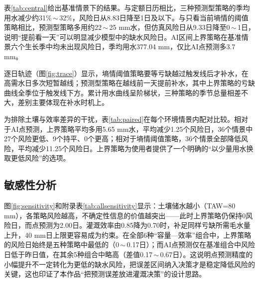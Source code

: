 表\ref{tab:central}给出基准情景下的结果。与定额日历相比，三种预测型策略的季均用水减少约31\%\,$\sim$\,32\%，风险日从8.83日降至1日及以下。与只看当前墒情的阈值策略相比，预测型策略多用约22\,$\sim$\,25 mm水，但仿真风险日从9.33日降至0\,$\sim$\,1日，说明“提前看一天”可以明显减少模型中的缺水风险日。AI区间上界策略在基准情景六个生长季中均未出现风险日，季均用水377.04 mm，仅比AI点预测多3.7 mm。


逐日轨迹（图\ref{fig:trace}）显示，墒情阈值策略要等亏缺越过触发线后才补水，在高需水日多次短暂越线；预测型策略在越线前一天提前补水，其中上界策略的亏缺曲线全季位于触发线下方。累计用水曲线呈阶梯状，三种策略的季节总量相差不大，差别主要体现在补水时机上。




为排除土壤与效率差异的干扰，表\ref{tab:paired}在每个环境情景内配对比较。相对于AI点预测，上界策略平均多用5.65 mm水，平均减少1.25个风险日，36个情景中27个风险更低、9个持平、0个更高；相对于墒情阈值策略，36个情景全部降低风险，平均减少11.25个风险日。上界策略为使用者提供了一个明确的“以少量用水换取更低风险”的选项。

\subsection{敏感性分析}

图\ref{fig:sensitivity}和附录表\ref{tab:allsensitivity}显示：土壤储水越小（TAW=80 mm），各策略风险越高，不确定性信息的价值越突出——此时上界策略仍保持0风险日，而点预测为2.00日。灌溉效率由0.85降为0.70时，补足同样亏缺所需毛水量上升，40 mm日上限更容易成为约束。在全部6种“容量—效率”组合中，上界策略的风险日始终是五种策略中最低的（0\,$\sim$\,0.17日）；而AI点预测仅在基准组合中风险日低于昨日值，在其余5种组合中略高（差值0.17\,$\sim$\,0.67日）。这说明点预测精度的小幅提升不一定转化为更低的缺水风险，把误差区间纳入决策才是稳定降低风险的关键，这也印证了本作品“把预测误差放进灌溉决策”的设计思路。

